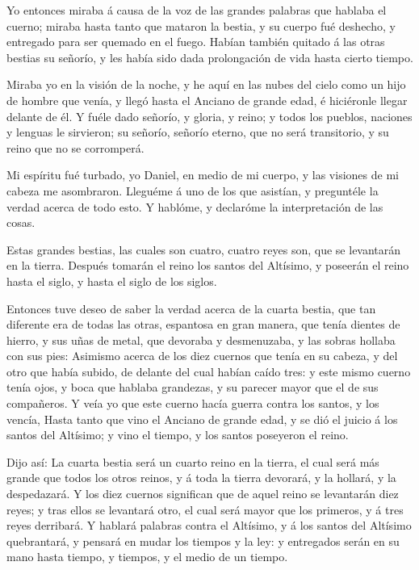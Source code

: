  Yo entonces miraba á causa de la voz de las grandes
palabras que hablaba el cuerno; miraba hasta tanto que mataron la
bestia, y su cuerpo fué deshecho, y entregado para ser quemado en el
fuego.  Habían también quitado á las otras bestias su
señorío, y les había sido dada prolongación de vida hasta cierto tiempo.

 Miraba yo en la visión de la noche, y he aquí en las nubes
del cielo como un hijo de hombre que venía, y llegó hasta el Anciano de
grande edad, é hiciéronle llegar delante de él.  Y fuéle
dado señorío, y gloria, y reino; y todos los pueblos, naciones y lenguas
le sirvieron; su señorío, señorío eterno, que no será transitorio, y su
reino que no se corromperá.

 Mi espíritu fué turbado, yo Daniel, en medio de mi cuerpo,
y las visiones de mi cabeza me asombraron.  Lleguéme á uno
de los que asistían, y preguntéle la verdad acerca de todo esto. Y
hablóme, y declaróme la interpretación de las cosas.

 Estas grandes bestias, las cuales son cuatro, cuatro reyes
son, que se levantarán en la tierra.  Después tomarán el
reino los santos del Altísimo, y poseerán el reino hasta el siglo, y
hasta el siglo de los siglos.

 Entonces tuve deseo de saber la verdad acerca de la cuarta
bestia, que tan diferente era de todas las otras, espantosa en gran
manera, que tenía dientes de hierro, y sus uñas de metal, que devoraba y
desmenuzaba, y las sobras hollaba con sus pies:  Asimismo
acerca de los diez cuernos que tenía en su cabeza, y del otro que había
subido, de delante del cual habían caído tres: y este mismo cuerno tenía
ojos, y boca que hablaba grandezas, y su parecer mayor que el de sus
compañeros.  Y veía yo que este cuerno hacía guerra contra
los santos, y los vencía,  Hasta tanto que vino el Anciano
de grande edad, y se dió el juicio á los santos del Altísimo; y vino el
tiempo, y los santos poseyeron el reino.

 Dijo así: La cuarta bestia será un cuarto reino en la
tierra, el cual será más grande que todos los otros reinos, y á toda la
tierra devorará, y la hollará, y la despedazará.  Y los
diez cuernos significan que de aquel reino se levantarán diez reyes; y
tras ellos se levantará otro, el cual será mayor que los primeros, y á
tres reyes derribará.  Y hablará palabras contra el
Altísimo, y á los santos del Altísimo quebrantará, y pensará en mudar
los tiempos y la ley: y entregados serán en su mano hasta tiempo, y
tiempos, y el medio de un tiempo.

